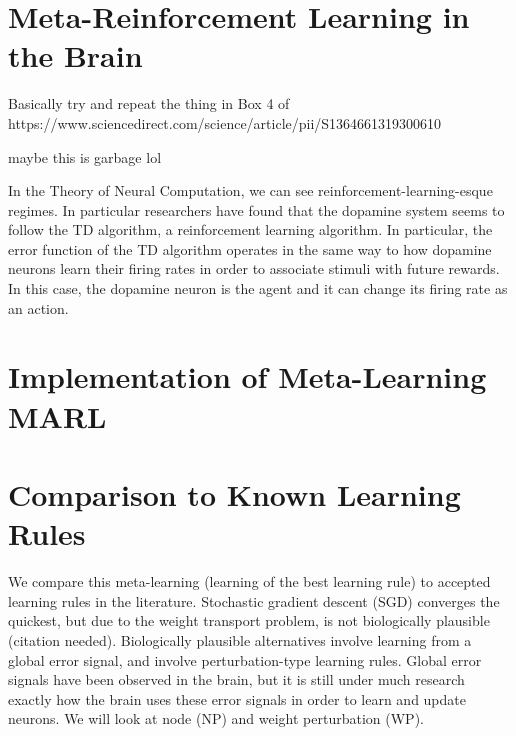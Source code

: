 \documentclass[11pt,letterpaper]{article}
\begin{document}
\section{Meta-Reinforcement Learning in the Brain}

Basically try and repeat the thing in Box 4 of https://www.sciencedirect.com/science/article/pii/S1364661319300610




maybe this is garbage lol

In the Theory of Neural Computation, we can see reinforcement-learning-esque
regimes. In particular researchers have found that the dopamine system seems
to follow the TD algorithm, a reinforcement learning algorithm. In particular, the error
function of the TD algorithm operates in the same way to how dopamine neurons learn their firing rates in order to 
associate stimuli with future rewards. In this case, the dopamine neuron is the agent
and it can change its firing rate as an action. 





\section{Implementation of Meta-Learning MARL}



\section{Comparison to Known Learning Rules}

We compare this meta-learning (learning of the best learning rule) to accepted learning rules in the literature. Stochastic gradient descent (SGD) converges the quickest, but due to the weight transport problem, is not biologically plausible (citation needed). Biologically plausible alternatives involve learning from a global error signal, and involve perturbation-type learning rules. Global error signals have been observed in the brain, but it is still under much research exactly how the brain uses these error signals in order to learn and update neurons. We will look at node (NP) and weight perturbation (WP).
\end{document}
